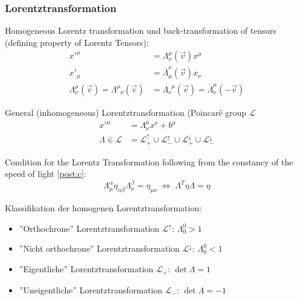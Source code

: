 		\subsubsection{Lorentztransformation}
			\noindent
			Homogeneous Lorentz transformation und back-transformation of tensors (defining property of Lorentz Tensors):%
			\begin{equation}
				\begin{aligned}
					x'^\mu &= \Lambda^{\mu}_{\nu}(\vec{v}) x^\mu \\
					x'_\mu &= \overline{\Lambda}_\mu^{\nu}(\vec{v}) x_\nu \\
					\Lambda^{\mu}_{\nu}(\vec{v}) = \Lambda^{\mu}_{\phantom{\mu}\nu}(\vec{v}) &= \Lambda^{\phantom{\nu}\mu}_{\nu}(\vec{v}) = \overline{\Lambda}^{\mu}_{\nu}(-\vec{v})
				\end{aligned}
			\end{equation}

			\noindent
			General (inhomogeneous) Lorentztransformation (Poincaré group $\mathcal{L}$%
			\begin{equation}
				\begin{aligned}
					x'^\mu &= \Lambda^\mu_{\nu} x^\nu + b^\mu \\
					\Lambda \in \mathcal{L} &= \mathcal{L}^\uparrow_+ \cup \mathcal{L}^\uparrow_- \cup \mathcal{L}^\downarrow_+ \cup \mathcal{L}^\downarrow_-
				\end{aligned}
			\end{equation}

			\noindent
			Condition for the Lorentz Transformation following from the constancy of the speed of light \ref{post:c}:%
			\begin{equation}
				\Lambda^{\alpha}_{\mu} \eta_{\alpha\beta} \Lambda^{\beta}_{\nu} = \eta_{\mu\nu}
				 \;\Leftrightarrow\; \Lambda^T \eta \Lambda = \eta
			\end{equation}

			\noindent
			Klassifikation der homogenen Lorentztransformation:
			\begin{itemize}
				\item ''Orthochrone'' Lorentztransformation $\mathcal{L}^\uparrow$: $\Lambda^0_0 > 1$
				\item ''Nicht orthochrone'' Lorentztransformation $\mathcal{L}^\downarrow$: $\Lambda^0_0 < 1$
				\item ''Eigentliche'' Lorentztransformation $\mathcal{L}_+$: $\det\Lambda = 1$
				\item ''Uneigentliche'' Lorentztransformation $\mathcal{L}_-$: $\det\Lambda = -1$
			\end{itemize}

